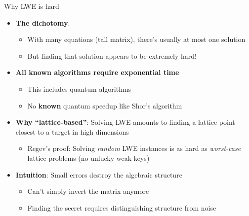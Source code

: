\ifdefined\PRESENTATION\else\PassOptionsToClass{handout}{beamer}\fi\documentclass[aspectratio=169, lualatex]{beamer}
\begin{document}
\begin{frame}{Why LWE is hard}
	\begin{itemize}
		\item \textbf{The dichotomy}:
		      \begin{itemize}
			      \item With many equations (tall matrix), there's usually at most one solution
			      \item But finding that solution appears to be extremely hard!
		      \end{itemize}
		\item \textbf{All known algorithms require exponential time}
		      \begin{itemize}
			      \item This includes quantum algorithms
			      \item No \textbf{known} quantum speedup like Shor's algorithm
		      \end{itemize}
		\item \textbf{Why ``lattice-based''}: Solving LWE amounts to finding a lattice point closest to a target in high dimensions
		      \begin{itemize}
			      \item Regev's proof: Solving \textit{random} LWE instances is as hard as \textit{worst-case} lattice problems (no unlucky weak keys)
		      \end{itemize}
		\item \textbf{Intuition}: Small errors destroy the algebraic structure
		      \begin{itemize}
			      \item Can't simply invert the matrix anymore
			      \item Finding the secret requires distinguishing structure from noise
		      \end{itemize}
	\end{itemize}
\end{frame}
\end{document}
